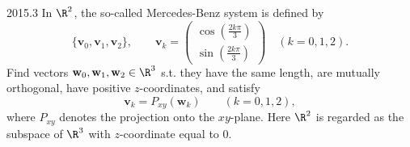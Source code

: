    \begin{pastproblem}{2015.3}
        In $\R^2$, the so-called Mercedes-Benz system is defined by
        \[
            \{\mathbf{v}_0,\mathbf{v}_1,\mathbf{v}_2\},
            \qquad
            \mathbf{v}_k
            =
            \begin{pmatrix}
                \cos\left(\frac{2k\pi}{3}\right) \\
                \sin\left(\frac{2k\pi}{3}\right)
            \end{pmatrix}
            \quad
            (k=0,1,2).
        \]
        Find vectors $\mathbf{w}_0,\mathbf{w}_1,\mathbf{w}_2\in\R^3$ s.t. they have the same
        length, are mutually orthogonal, have positive $z$-coordinates, and satisfy
        \[
            \mathbf{v}_k=P_{xy}(\mathbf{w}_k)
            \qquad
            (k=0,1,2),
        \]
        where $P_{xy}$ denotes the projection onto the $xy$-plane. Here $\R^2$ is regarded as the
        subspace of $\R^3$ with $z$-coordinate equal to $0$.
    \end{pastproblem}

